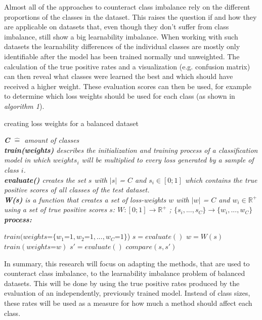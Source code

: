 \documentclass[journal]{IEEEtran}
\begin{document}
Almost all of the approaches to counteract class imbalance rely on the different proportions of the classes in the dataset.
This raises the question if and how they are applicable on datasets that, even though they don't suffer from class imbalance, still show a big learnability imbalance.
When working with such datasets the learnability differences of the individual classes are mostly only identifiable after the model has been trained normally und unweighted. %
The calculation of the true positive rates and a visualization (e.g. confusion matrix) can then reveal what classes were learned the best and which should have received a higher weight.
These evaluation scores can then be used, for example to determine which loss weights should be used for each class (as shown in \emph{algorithm 1}).

\begin{algorithm}[H]
        \caption{creating loss weights for a balanced dataset}

        \textit{\textbf{C} $\hat{=}$ amount of classes}
        \\ \textit{\textbf{train(weights)} describes the initialization and training process of a classification model in which $weights_i$ will be multiplied to every loss generated by a sample of class $i$.}
        \\ \textit{\textbf{evaluate()} creates the set $s$ with $\left|s\right|$ = $C$ and $s_i \in [0;1]$ which contains the true positive scores of all classes of the test dataset.}
        \\ \textit{\textbf{W(s)} is a function that creates a set of loss-weights $w$ with $\left|w\right|$ = $C$ and $w_i \in \mathbb{R}^{+}$ using a set of true positive scores $s$: $W: [0;1] \rightarrow \mathbb{R}^{+}$ ; $\{s_i,...,s_C\} \rightarrow \{w_i,...,w_C\}$ }
        \\ \textit{\textbf{process:}}
        \begin{algorithmic}[1]
         \STATE $train(weights\texttt{=}\{w_1\texttt{=}1, w_2\texttt{=}1, ..., w_C\texttt{=}1\}$)
         \STATE $s = evaluate()$
         \STATE $w = W(s)$
         \STATE $train(weights\texttt{=}w)$
         \STATE $s' = evaluate()$
         \STATE $compare(s, s')$

        \end{algorithmic}
\end{algorithm}

In summary, this research will focus on adapting the methods, that are used to counteract class imbalance, to the learnability imbalance problem of balanced datasets.
This will be done by using the true positive rates produced by the evaluation of an independently, previously trained model.
Instead of class sizes, these rates will be used as a measure for how much a method should affect each class.
\end{document}
